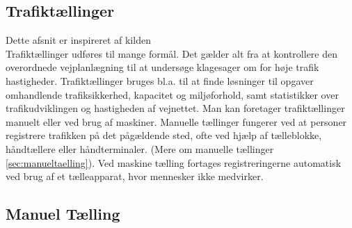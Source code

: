 \subsection{Trafiktællinger}
\label{subs:trafiktaellinger}

Dette afsnit er inspireret af kilden %
\\
Trafiktællinger udføres til mange formål. Det gælder alt fra at kontrollere den overordnede vejplanlægning
til at undersøge klagesager om for høje trafik hastigheder. Trafiktællinger bruges bl.a. til at finde løsninger
til opgaver omhandlende trafiksikkerhed, kapacitet og miljøforhold, samt statistikker over trafikudviklingen
og hastigheden af vejnettet. Man kan foretager trafiktællinger manuelt eller ved brug af maskiner.
Manuelle tællinger fungerer ved at personer registrere trafikken på det pågældende sted, ofte ved hjælp af
tælleblokke, håndtællere eller håndterminaler. (Mere om manuelle tællinger \cref{sec:manueltaelling}). Ved maskine
tælling fortages registreringerne automatisk ved brug af et tælleapparat, hvor mennesker ikke medvirker.
\subsection{Manuel Tælling}
\label{subs:manueltaelling}

